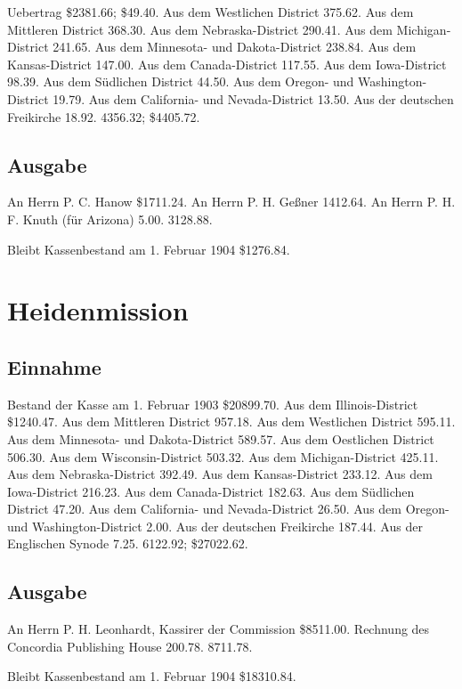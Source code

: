Uebertrag \$2381.66; \$49.40. Aus dem Westlichen District 375.62. Aus dem Mittleren District 368.30. Aus dem Nebraska-District 290.41. Aus dem Michigan-District 241.65. Aus dem Minnesota- und Dakota-District 238.84. Aus dem Kansas-District 147.00. Aus dem Canada-District 117.55. Aus dem Iowa-District 98.39. Aus dem Südlichen District 44.50. Aus dem Oregon- und Washington-District 19.79. Aus dem California- und Nevada-District 13.50. Aus der deutschen Freikirche 18.92. 4356.32; \$4405.72.

\subsection{Ausgabe}

An Herrn P. C. Hanow \$1711.24. An Herrn P. H. Geßner 1412.64. An Herrn P. H. F. Knuth (für Arizona) 5.00. 3128.88.

Bleibt Kassenbestand am 1. Februar 1904 \$1276.84.

\section{Heidenmission}

\subsection{Einnahme}

Bestand der Kasse am 1. Februar 1903 \$20899.70. Aus dem Illinois-District \$1240.47. Aus dem Mittleren District 957.18. Aus dem Westlichen District 595.11. Aus dem Minnesota- und Dakota-District 589.57. Aus dem Oestlichen District 506.30. Aus dem Wisconsin-District 503.32. Aus dem Michigan-District 425.11. Aus dem Nebraska-District 392.49. Aus dem Kansas-District 233.12. Aus dem Iowa-District 216.23. Aus dem Canada-District 182.63. Aus dem Südlichen District 47.20. Aus dem California- und Nevada-District 26.50. Aus dem Oregon- und Washington-District 2.00. Aus der deutschen Freikirche 187.44. Aus der Englischen Synode 7.25. 6122.92; \$27022.62.

\subsection{Ausgabe}

An Herrn P. H. Leonhardt, Kassirer der Commission \$8511.00. Rechnung des Concordia Publishing House 200.78. 8711.78.

Bleibt Kassenbestand am 1. Februar 1904 \$18310.84.

